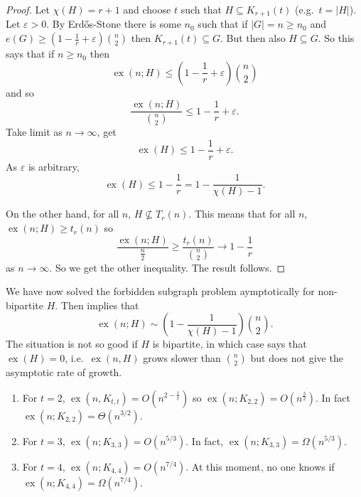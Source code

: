 \documentclass[a4paper]{article}
\DeclareMathOperator{\exx}{ex} %
\begin{document}
\begin{proof}
  Let \(\chi(H) = r + 1\) and choose \(t\) such that \(H \subseteq K_{r + 1}(t)\) (e.g.\ \(t = |H|\)). Let \(\varepsilon > 0\). By Erdős-Stone there is some \(n_0\) such that if \(|G| = n \geq n_0\) and \(e(G) \geq (1 - \frac{1}{r} + \varepsilon) \binom{n}{2}\) then \(K_{r + 1}(t) \subseteq G\). But then also \(H \subseteq G\). So this says that if \(n \geq n_0\) then
  \[
    \exx(n; H) \leq (1 - \frac{1}{r} + \varepsilon) \binom{n}{2}
  \]
  and so
  \[
    \frac{\exx(n; H)}{\binom{n}{2}} \leq 1 - \frac{1}{r} + \varepsilon.
  \]
  Take limit as \(n \to \infty\), get
  \[
    \exx(H) \leq 1 - \frac{1}{r} + \varepsilon.
  \]
  As \(\varepsilon\) is arbitrary,
  \[
    \exx(H) \leq 1 - \frac{1}{r} = 1 - \frac{1}{\chi(H) - 1}.
  \]

  On the other hand, for all \(n\), \(H \nsubseteq T_r(n)\). This means that for all \(n\), \(\exx(n; H) \geq t_r(n)\) so
  \[
    \frac{\exx(n; H)}{\frac{n}{2}} \geq \frac{t_r(n)}{\binom{n}{2}} \to 1 - \frac{1}{r}
  \]
  as \(n \to \infty\). So we get the other inequality. The result follows.
\end{proof}

We have now solved the forbidden subgraph problem aymptotically for non-bipartite \(H\). Then  implies that
\[
  \exx(n; H) \sim (1 - \frac{1}{\chi(H) - 1}) \binom{n}{2}.
\]
The situation is not so good if \(H\) is bipartite, in which case  says that \(\exx(H) = 0\), i.e.\ \(\exx(n, H)\) grows slower than \(\binom{n}{2}\) but does not give the asymptotic rate of growth.

\begin{eg}\leavevmode
  \begin{enumerate}
  \item For \(t = 2\), \(\exx(n, K_{t, t}) = O(n^{2 - \frac{1}{t}})\) so \(\exx(n; K_{2, 2}) = O(n^{\frac{3}{2}})\). In fact \(\exx(n; K_{2, 2}) = \Theta(n^{3/2})\).
  \item For \(t = 3\), \(\exx(n; K_{3, 3}) = O(n^{5/3})\). In fact, \(\exx(n; K_{3, 3}) = \Omega(n^{5/3})\).
  \item For \(t = 4\), \(\exx(n; K_{4, 4}) = O(n^{7/4})\). At this moment, no one knows if \(\exx(n; K_{4, 4}) = \Omega(n^{7/4})\).
  \end{enumerate}
\end{eg}
\end{document}

